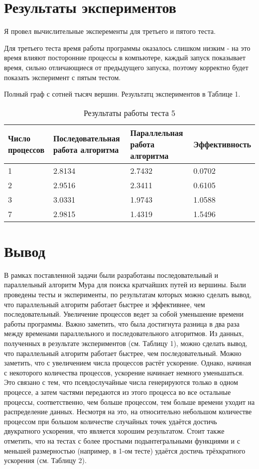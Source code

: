 \documentclass{report}
\begin{document}
\section*{Результаты экспериментов}
Я провел вычислительные эксперементы для третьего и пятого теста.
\par Для третьего теста время работы программы оказалось слишком низким - на это время влияют посторонние процессы в компьютере, каждый запуск показывает время, сильно отличающиеся от предыдущего запуска, поэтому корректно будет показать эксперимент с пятым тестом.
\par Полный граф с сотней тысяч вершин. Результатц экспериментов в Таблице 1.

\begin{table}[!h]
\caption{Результаты работы теста 5}
\centering
\begin{tabular}{| p{1cm} | p{3cm} | p{4cm} | p{3cm} |}
\hline
Число процессов & Последовательная работа алгоритма & Параллельная работа алгоритма & Эффективность  \\[5pt]
\hline
1        & 2.8134        & 2.7432     & 0.0702     \\
2        & 2.9516        & 2.3411     & 0.6105       \\
3        & 3.0331        & 1.9743     & 1.0588       \\
7        & 2.9815        & 1.4319     & 1.5496       \\
\hline
\end{tabular}
\end{table}
\newpage

\section*{Вывод}
В рамках поставленной задачи были разработаны последовательный и параллельный алгоритм Мура для поиска кратчайших путей из вершины. Были проведены тесты и эксперименты, по результатам которых можно сделать вывод, что параллельный алгоритм работает быстрее и эффективнее, чем последовательный. Увеличение процессов ведет за собой уменьшение времени работы программы. Важно заметить, что была достигнута разница в два раза между временами параллельного и последовательного алгоритмов.
Из данных, полученных в результате экспериментов (см. Таблицу 1), можно сделать вывод, что параллельный алгоритм работает быстрее, чем последовательный. Можно заметить, что с увеличением числа процессов растёт ускорение. Однако, начиная с некоторого количества процессов, ускорение начинает немного уменьшаться. Это связано с тем, что псевдослучайные числа генерируются только в одном процессе, а затем частями передаются из этого процесса во все остальные процессы, соответственно, чем больше процессом, тем больше времени уходит на распределение данных. Несмотря на это, на относительно небольшом количестве процессом при большом количестве случайных точек удаётся достичь двукратного ускорения, что является хорошим результатом. Стоит также отметить, что на тестах с более простыми подынтегральными функциями и с меньшей размерностью (например, в 1-ом тесте) удаётся достичь трёхкратного ускорения (см. Таблицу 2).
\end{document}
